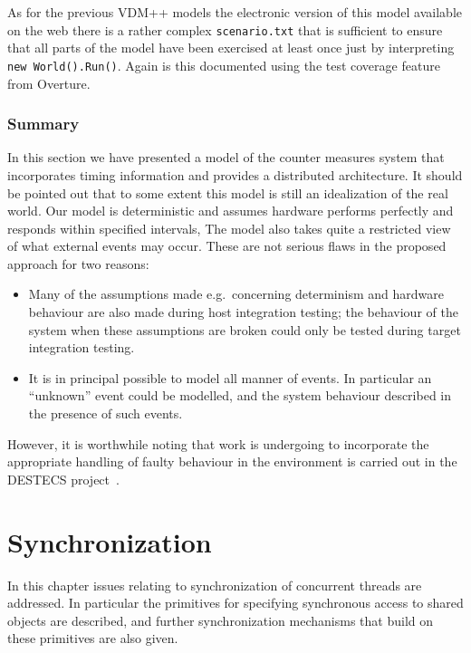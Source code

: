 \documentclass{overturerepchap}
\begin{document}
As for the previous VDM++ models the electronic
version of this model available on the web there is a rather complex 
\texttt{scenario.txt} that is sufficient to ensure that all parts of the
model have been exercised at least once just by interpreting
\texttt{new World().Run()}. Again is this documented using the test
coverage feature from Overture.

\subsection{Summary}

In this section we have presented a model of the counter measures
system that incorporates timing information and provides a distributed
architecture. It should be pointed out that to some extent this model
is still an idealization of the real world. Our model is deterministic and
assumes hardware performs perfectly and responds within specified
intervals, The model also takes quite a restricted view of what
external events may occur. These are not serious flaws in the proposed
approach for two reasons:

\begin{itemize}
\item Many of the assumptions made e.g.\ concerning determinism and
hardware behaviour are also made during host integration testing;
the behaviour of the system when these assumptions are broken could
only be tested during target integration testing.
\item It is in principal possible to model all manner of events. In
particular an ``unknown'' event could be modelled, and the system
behaviour described in the presence of such events.
\end{itemize}

However, it is worthwhile noting that work is undergoing to
incorporate the appropriate handling of faulty behaviour in the
environment is carried out in the DESTECS project~\cite{Broenink&10,Fitzgerald&10b}. 

\chapter{Synchronization}\label{chap:sync}

In this chapter issues relating to synchronization of concurrent
threads are addressed.  In particular the primitives for specifying
synchronous access to shared objects are described, and further
synchronization mechanisms that build on these primitives are also
given.
\end{document}
